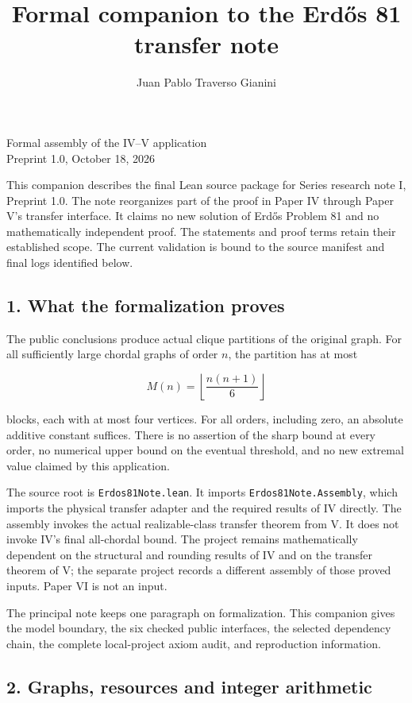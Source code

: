 \documentclass[english,11pt,a4paper]{article}
\title{Formal companion to the Erdős 81 transfer note}
\author{Juan Pablo Traverso Gianini}
\date{}
\begin{document}
\raggedbottom\maketitle
Formal assembly of the IV--V application\\
Preprint 1.0, October 18, 2026

This companion describes the final Lean source package for Series
research note I, Preprint 1.0. The note reorganizes part of the proof in
Paper IV through Paper V's transfer interface. It claims no new solution
of Erdős Problem 81 and no mathematically independent proof. The
statements and proof terms retain their established scope. The current
validation is bound to the source manifest and final logs identified
below.

\subsection{1. What the formalization
proves}\label{what-the-formalization-proves}

The public conclusions produce actual clique partitions of the original
graph. For all sufficiently large chordal graphs of order \(n\), the
partition has at most

\[
M(n)=\left\lfloor\frac{n(n+1)}6\right\rfloor
\]

blocks, each with at most four vertices. For all orders, including zero,
an absolute additive constant suffices. There is no assertion of the
sharp bound at every order, no numerical upper bound on the eventual
threshold, and no new extremal value claimed by this application.

The source root is \nolinkurl{Erdos81Note.lean}. It imports
\nolinkurl{Erdos81Note.Assembly}, which imports the physical transfer
adapter and the required results of IV directly. The assembly invokes
the actual realizable-class transfer theorem from V. It does not invoke
IV's final all-chordal bound. The project remains mathematically
dependent on the structural and rounding results of IV and on the
transfer theorem of V; the separate project records a different assembly
of those proved inputs. Paper VI is not an input.

The principal note keeps one paragraph on formalization. This companion
gives the model boundary, the six checked public interfaces, the
selected dependency chain, the complete local-project axiom audit, and
reproduction information.

\subsection{2. Graphs, resources and integer
arithmetic}\label{graphs-resources-and-integer-arithmetic}
\end{document}
